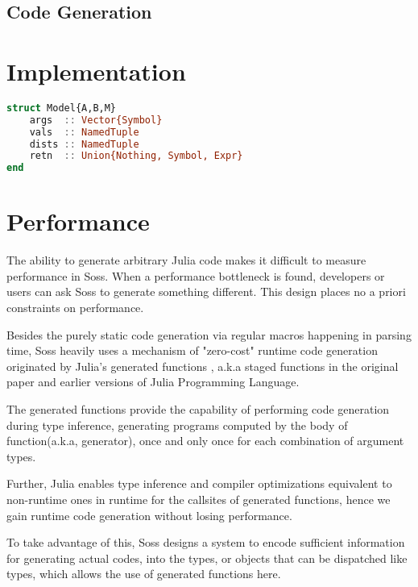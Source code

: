 \documentclass[anonymous=false, %
               format=acmsmall, %
               review=true, %
               screen=true, %
               nonacm=true]{acmart}
\begin{document}
\subsection{Code Generation}

\section{Implementation}

\begin{lstlisting}[language=julia]
struct Model{A,B,M} 
    args  :: Vector{Symbol}
    vals  :: NamedTuple
    dists :: NamedTuple
    retn  :: Union{Nothing, Symbol, Expr}
end
\end{lstlisting}


\section{Performance}



The ability to generate arbitrary  Julia code makes it difficult to measure performance in Soss. When a performance bottleneck is found, developers or users can ask Soss to generate something different. This design places no a priori constraints on performance.


Besides the purely static code generation via regular macros happening in parsing time, Soss heavily uses a mechanism of "zero-cost" runtime code generation originated by Julia's generated functions \cite{bezanson2012julia}, a.k.a staged functions in the original paper and earlier versions of Julia Programming Language.

The generated functions provide the capability of performing code generation during type inference, generating programs computed by the body of function(a.k.a, generator), once and only once for each combination of argument types.

Further, Julia enables type inference and compiler optimizations equivalent to non-runtime ones in runtime for the callsites of generated functions, hence we gain runtime code generation without losing performance.

To take advantage of this, Soss designs a system to encode sufficient information for generating actual codes, into the types, or objects that can be dispatched like types, which allows the use of generated functions here.
\end{document}
